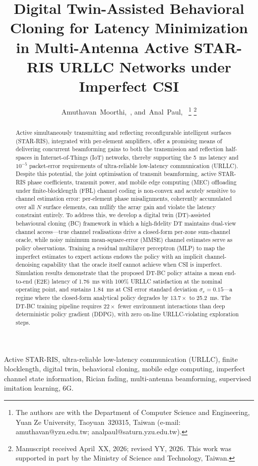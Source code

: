 \documentclass[journal]{IEEEtran}
\title{Digital Twin-Assisted Behavioral Cloning for Latency Minimization
       in Multi-Antenna Active STAR-RIS URLLC Networks under Imperfect CSI}
\author{Amuthavan~Moorthi,~\IEEEmembership{Student Member,~IEEE},
        and~Anal~Paul,~\IEEEmembership{Member,~IEEE}%
\thanks{The authors are with the Department of Computer Science and Engineering,
Yuan Ze University, Taoyuan~320315, Taiwan (e-mail:
amuthavan@yzu.edu.tw; analpaul@saturn.yzu.edu.tw).}%
\thanks{Manuscript received April~XX, 2026; revised YY, 2026. This work was
supported in part by the Ministry of Science and Technology, Taiwan.}}
\begin{document}
\maketitle

\begin{abstract}
Active simultaneously transmitting and reflecting reconfigurable
intelligent surfaces (STAR-RIS), integrated with per-element
amplifiers, offer a promising means of delivering concurrent
beamforming gains to both the transmission and reflection half-spaces
in Internet-of-Things (IoT) networks, thereby supporting the 5~ms
latency and $10^{-5}$ packet-error requirements of ultra-reliable
low-latency communication (URLLC). Despite this potential, the joint
optimisation of transmit beamforming, active STAR-RIS phase
coefficients, transmit power, and mobile edge computing (MEC)
offloading under finite-blocklength (FBL) channel coding is
non-convex and acutely sensitive to channel estimation error:
per-element phase misalignments, coherently accumulated over all $N$
surface elements, can nullify the array gain and violate the latency
constraint entirely. To address this, we develop a digital
twin (DT)-assisted behavioural cloning (BC) framework in which a
high-fidelity DT maintains dual-view channel access---true channel
realisations drive a closed-form per-zone sum-channel oracle, while
noisy minimum mean-square-error (MMSE) channel estimates serve as
policy observations. Training a residual multilayer perceptron (MLP)
to map the imperfect estimates to expert actions endows the policy
with an implicit channel-denoising capability that the oracle itself
cannot achieve when CSI is imperfect. Simulation results demonstrate
that the proposed DT-BC policy attains a mean end-to-end (E2E)
latency of 1.76~ms with 100\% URLLC satisfaction at the nominal
operating point, and sustains 1.84~ms at CSI error standard deviation
$\sigma_e\!=\!0.15$---a regime where the closed-form analytical
policy degrades by $13.7\times$ to 25.2~ms. The DT-BC training pipeline requires $22\times$ fewer
environment interactions than deep deterministic policy gradient
(DDPG), with zero on-line URLLC-violating exploration steps.
\end{abstract}

\begin{IEEEkeywords}
Active STAR-RIS, ultra-reliable low-latency communication (URLLC),
finite blocklength, digital twin, behavioral cloning, mobile edge
computing, imperfect channel state information, Rician fading,
multi-antenna beamforming, supervised imitation learning, 6G.
\end{IEEEkeywords}
\end{document}
